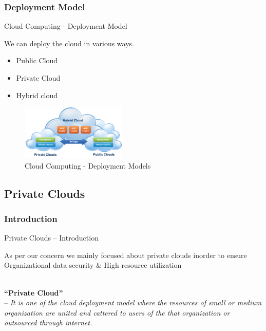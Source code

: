 \documentclass[xcolor=dvipsnames]{beamer}
\begin{document}
\subsubsection{Deployment Model }
\begin{frame}{Cloud Computing - Deployment Model }

We can deploy the cloud in various ways.

\begin{itemize}
\item Public Cloud
\item Private Cloud
\item Hybrid cloud
\end{itemize}

\begin{figure}[H]
 \centering
 \includegraphics[width=5cm]{./model.png}
 \caption{Cloud Computing - Deployment Models \label{fig:model} }
\end{figure}
\end{frame}
\subsection{Private Clouds}
\subsubsection{Introduction}
\begin{frame}{Private Clouds -- Introduction}

As per our concern we mainly focused about private clouds inorder to ensure Organizational data security \& High resource utilization

\hspace{4cm}\\

\textbf{``Private Cloud''} \\ 
\hspace{16mm} -- \textit{It is one of the cloud deployment model where the resources of small or medium organization are united and cattered to users of the that organization or outsourced through internet.} 

\end{frame}
\end{document}
